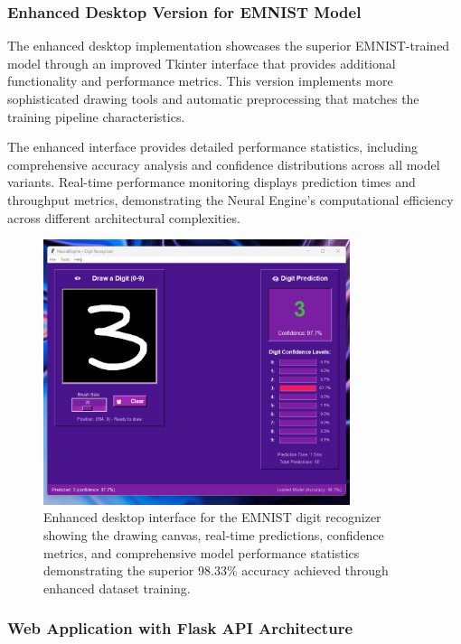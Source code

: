 \documentclass[11pt,a4paper]{report}
\begin{document}
\subsubsection{Enhanced Desktop Version for EMNIST Model}

The enhanced desktop implementation showcases the superior EMNIST-trained model through an improved Tkinter interface that provides additional functionality and performance metrics. This version implements more sophisticated drawing tools and automatic preprocessing that matches the training pipeline characteristics.

The enhanced interface provides detailed performance statistics, including comprehensive accuracy analysis and confidence distributions across all model variants. Real-time performance monitoring displays prediction times and throughput metrics, demonstrating the Neural Engine's computational efficiency across different architectural complexities.

\begin{figure}[H]
\centering
\includegraphics[width=0.8\textwidth]{digit_recognizer_desktop_interface.png}
\caption{Enhanced desktop interface for the EMNIST digit recognizer showing the drawing canvas, real-time predictions, confidence metrics, and comprehensive model performance statistics demonstrating the superior 98.33\% accuracy achieved through enhanced dataset training.}
\label{fig:digit_desktop}
\end{figure}

\subsubsection{Web Application with Flask API Architecture}
\end{document}
